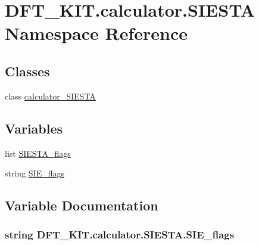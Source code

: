 \hypertarget{namespace_d_f_t___k_i_t_1_1calculator_1_1_s_i_e_s_t_a}{\section{D\+F\+T\+\_\+\+K\+I\+T.\+calculator.\+S\+I\+E\+S\+T\+A Namespace Reference}
\label{namespace_d_f_t___k_i_t_1_1calculator_1_1_s_i_e_s_t_a}
}
\subsection*{Classes}
\begin{DoxyCompactItemize}
\item 
class \hyperlink{class_d_f_t___k_i_t_1_1calculator_1_1_s_i_e_s_t_a_1_1calculator___s_i_e_s_t_a}{calculator\+\_\+\+S\+I\+E\+S\+T\+A}
\end{DoxyCompactItemize}
\subsection*{Variables}
\begin{DoxyCompactItemize}
\item 
list \hyperlink{namespace_d_f_t___k_i_t_1_1calculator_1_1_s_i_e_s_t_a_ae83e5ef1b4c41f4272ed134b22f6f3c9}{S\+I\+E\+S\+T\+A\+\_\+flags}
\item 
string \hyperlink{namespace_d_f_t___k_i_t_1_1calculator_1_1_s_i_e_s_t_a_af058c84c65fdd8bc16fb661c1d552152}{S\+I\+E\+\_\+flags}
\end{DoxyCompactItemize}


\subsection{Variable Documentation}
\hypertarget{namespace_d_f_t___k_i_t_1_1calculator_1_1_s_i_e_s_t_a_af058c84c65fdd8bc16fb661c1d552152}{
\subsubsection[{S\+I\+E\+\_\+flags}]{\setlength{\rightskip}{0pt plus 5cm}string D\+F\+T\+\_\+\+K\+I\+T.\+calculator.\+S\+I\+E\+S\+T\+A.\+S\+I\+E\+\_\+flags}}\label{namespace_d_f_t___k_i_t_1_1calculator_1_1_s_i_e_s_t_a_af058c84c65fdd8bc16fb661c1d552152}


